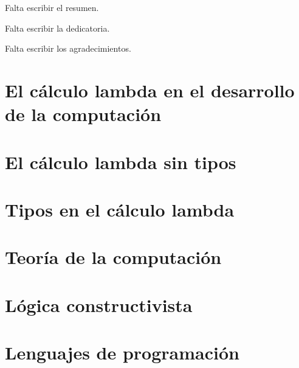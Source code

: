 \documentclass[12pt]{tesislcc}
\begin{document}

\portada%

\frontmatter

\begin{resumen}
  Falta escribir el resumen.
\end{resumen}

\begin{dedicatoria}
  Falta escribir la dedicatoria.
\end{dedicatoria}

\begin{agradecimientos}
  Falta escribir los agradecimientos.
\end{agradecimientos}

\tableofcontents

\mainmatter%

\introduccion%


\chapter{El cálculo lambda en el desarrollo de la computación}


\chapter{El cálculo lambda sin tipos}


\chapter{Tipos en el cálculo lambda}


\chapter{Teoría de la computación}


\chapter{Lógica constructivista}


\chapter{Lenguajes de programación}

\end{document}

